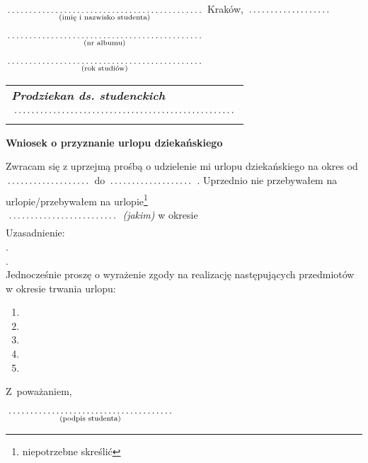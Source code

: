 \documentclass[a4paper,8pt]{article}
\newcommand{\fillField}[2]{
    $\underset{\text{#1}}{\parbox[t]{#2}{\dotfill}}$
}
\begin{document}
\noindent
\fillField{(imię i nazwisko studenta)}{7cm} \hfill Kraków, \fillField{}{3cm}\\\\
\fillField{(nr albumu)}{7cm} \\\\
\fillField{(rok studiów)}{7cm} \\


\phantom{a}\hfill
\begin{tabular}[c]{@{}l@{}}
\textit{\textbf{Prodziekan ds. studenckich}} \\\\
\fillField{}{8cm}
\end{tabular}

\vskip 1.5cm

\begin{center}
{\Large \textbf{Wniosek o przyznanie urlopu dziekańskiego}}
\end{center}

\vskip 0.5cm

\noindent
Zwracam się z uprzejmą prośbą o udzielenie mi urlopu dziekańskiego na okres
od \fillField{}{3cm} do \fillField{}{3cm}. Uprzednio nie przebywałem na
urlopie/przebywałem na urlopie\footnote[1]{niepotrzebne skreślić} \\
\fillField{}{4cm} \textit{(jakim)} w okresie
\dotfill\\
Uzasadnienie: \dotfill\\
.\dotfill\\
.\dotfill\\

\noindent
Jednocześnie proszę o wyrażenie zgody na realizację następujących przedmiotów
w okresie trwania urlopu:
    \begin{enumerate}
        \item \dotfill
        \item \dotfill
        \item \dotfill
        \item \dotfill
        \item \dotfill
    \end{enumerate}

\vskip 1.3cm

\hspace{\fill} Z~poważaniem, \hspace{3cm} \\\\
\null\hfill \fillField{(podpis studenta)}{6cm} %
\vskip 1.0cm
\end{document}
